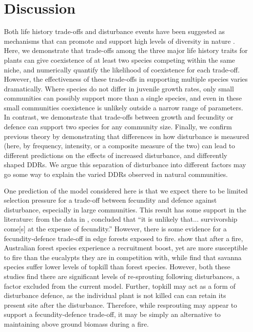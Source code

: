 \documentclass[a4paper]{article}
\begin{document}
\section{Discussion}
Both life history trade-offs and disturbance events have been suggested as mechanisms that can promote and support high levels of diversity in nature \citep[e.g.][]{adler2000space,denslow1987tropical,sousa1984role,turnbull1999seed}. Here, we demonstrate that trade-offs among the three major life history traits for plants can give coexistence of at least two species competing within the same niche, and numerically quantify the likelihood of coexistence for each trade-off. However, the effectiveness of these trade-offs in supporting multiple species varies dramatically. Where species do not differ in juvenile growth rates, only small communities can possibly support more than a single species, and even in these small communities coexistence is unlikely outside a narrow range of parameters. In contrast, we demonstrate that trade-offs between growth and fecundity or defence can support two species for any community size. Finally, we confirm previous theory \citep{miller2011frequency} by demonstrating that differences in how disturbance is measured (here, by frequency, intensity, or a composite measure of the two) can lead to different predictions on the effects of increased disturbance, and differently shaped DDRs. We argue this separation of disturbance into different factors may go some way to explain the varied DDRs observed in natural communities.

One prediction of the model considered here is that we expect there to be limited selection pressure for a trade-off between fecundity and defence against disturbance, especially in large communities. This result has some support in the literature: from the data in \cite{martin2010dispersal}, \cite{martin2010divergence} concluded that ``it is unlikely that... survivorship come[s] at the expense of fecundity.'' However, there is some evidence for a fecundity-defence trade-off in edge forests exposed to fire. \cite{williams2012mechanisms} show that after a fire, Australian forest species experience a recruitment boost, yet are more susceptible to fire than the eucalypts they are in competition with, while \cite{hoffmann2009tree} find that savanna species suffer lower levels of topkill than forest species. However, both these studies find there are significant levels of re-sprouting following disturbances, a factor excluded from the current model. Further, topkill may act as a form of disturbance defence, as the individual plant is not killed can can retain its present site after the disturbance. Therefore, while resprouting may appear to support a fecundity-defence trade-off, it may be simply an alternative to maintaining above ground biomass during a fire.
\end{document}

